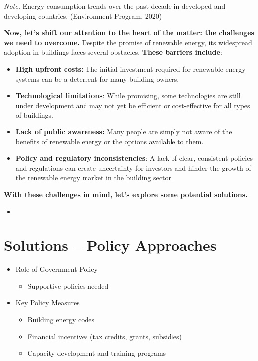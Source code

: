 \documentclass[
  letterpaper,
  DIV=11,
  numbers=noendperiod]{scrartcl}
\providecommand{\tightlist}{%
  \setlength{\itemsep}{0pt}\setlength{\parskip}{0pt}}\usepackage{longtable,booktabs,array}
\begin{document}
\emph{Note.} Energy consumption trends over the past decade in developed
and developing countries. (Environment Program, 2020)

\textbf{Now, let's shift our attention to the heart of the matter: the
challenges we need to overcome.} Despite the promise of renewable
energy, its widespread adoption in buildings faces several obstacles.
\textbf{These barriers include}:

\begin{itemize}
\tightlist
\item
  \textbf{High upfront costs:} The initial investment required for
  renewable energy systems can be a deterrent for many building owners.
\item
  \textbf{Technological limitations}: While promising, some technologies
  are still under development and may not yet be efficient or
  cost-effective for all types of buildings.
\item
  \textbf{Lack of public awareness:} Many people are simply not aware of
  the benefits of renewable energy or the options available to them.
\item
  \textbf{Policy and regulatory inconsistencies}: A lack of clear,
  consistent policies and regulations can create uncertainty for
  investors and hinder the growth of the renewable energy market in the
  building sector.
\end{itemize}

\textbf{With these challenges in mind, let's explore some potential
solutions.}

\begin{itemize}
\tightlist
\item
\end{itemize}

\section{Solutions -- Policy
Approaches}\label{solutions-policy-approaches}

\begin{itemize}
\tightlist
\item
  Role of Government Policy

  \begin{itemize}
  \tightlist
  \item
    Supportive policies needed
  \end{itemize}
\item
  Key Policy Measures

  \begin{itemize}
  \tightlist
  \item
    Building energy codes
  \item
    Financial incentives (tax credits, grants, subsidies)
  \item
    Capacity development and training programs
  \end{itemize}
\end{itemize}
\end{document}

